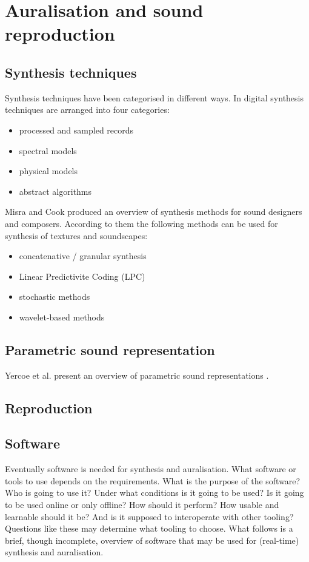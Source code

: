 \section{Auralisation and sound reproduction}

\subsection{Synthesis techniques}
Synthesis techniques have been categorised in different ways. In \cite{JuliusO.Smith} digital synthesis techniques are arranged into four categories:
\begin{itemize}
 \item processed and sampled records
 \item spectral models
 \item physical models
 \item abstract algorithms
\end{itemize}

Misra and Cook produced an overview of synthesis methods for sound designers and 
composers.
According to them the following methods can be used for synthesis of textures 
and soundscapes:
\begin{itemize}
 \item concatenative / granular synthesis
 \item Linear Predictivite Coding (LPC)
 \item stochastic methods
 \item wavelet-based methods
\end{itemize}


\subsection{Parametric sound representation}
Yercoe et al. present an overview of parametric sound representations \cite{Vercoe1998}.

\subsection{Reproduction}


\newpage
\subsection{Software}\label{sec:theory:auralisation:software}
Eventually software is needed for synthesis and auralisation. What software or
tools to use depends on the requirements. What is the purpose of the software?
Who is going to use it? Under what conditions is it going to be used? Is it
going to be used online or only offline? How should it perform? How usable and
learnable should it be? And is it supposed to interoperate with other tooling?
Questions like these may determine what tooling to choose. What follows is a
brief, though incomplete, overview of software that may be used for (real-time)
synthesis and auralisation.

